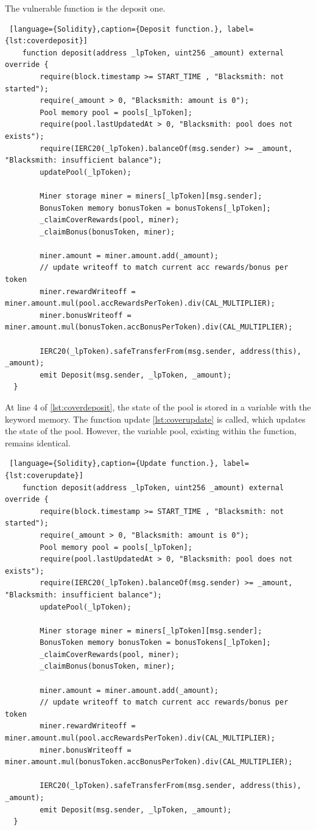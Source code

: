 The vulnerable function is the deposit one.
\begin{lstlisting} [language={Solidity},caption={Deposit function.}, label={lst:coverdeposit}]
    function deposit(address _lpToken, uint256 _amount) external override {
        require(block.timestamp >= START_TIME , "Blacksmith: not started");
        require(_amount > 0, "Blacksmith: amount is 0");
        Pool memory pool = pools[_lpToken];
        require(pool.lastUpdatedAt > 0, "Blacksmith: pool does not exists");
        require(IERC20(_lpToken).balanceOf(msg.sender) >= _amount, "Blacksmith: insufficient balance");
        updatePool(_lpToken);

        Miner storage miner = miners[_lpToken][msg.sender];
        BonusToken memory bonusToken = bonusTokens[_lpToken];
        _claimCoverRewards(pool, miner);
        _claimBonus(bonusToken, miner);

        miner.amount = miner.amount.add(_amount);
        // update writeoff to match current acc rewards/bonus per token
        miner.rewardWriteoff = miner.amount.mul(pool.accRewardsPerToken).div(CAL_MULTIPLIER);
        miner.bonusWriteoff = miner.amount.mul(bonusToken.accBonusPerToken).div(CAL_MULTIPLIER);

        IERC20(_lpToken).safeTransferFrom(msg.sender, address(this), _amount);
        emit Deposit(msg.sender, _lpToken, _amount);
  }
\end{lstlisting}
At line 4 of \autoref{lst:coverdeposit}, the state of the pool is stored in a variable with the keyword memory. 
The function update \autoref{lst:coverupdate} is called, which updates the state of the pool. However, the variable pool, 
existing within the function, remains identical. 
\begin{lstlisting} [language={Solidity},caption={Update function.}, label={lst:coverupdate}]
    function deposit(address _lpToken, uint256 _amount) external override {
        require(block.timestamp >= START_TIME , "Blacksmith: not started");
        require(_amount > 0, "Blacksmith: amount is 0");
        Pool memory pool = pools[_lpToken];
        require(pool.lastUpdatedAt > 0, "Blacksmith: pool does not exists");
        require(IERC20(_lpToken).balanceOf(msg.sender) >= _amount, "Blacksmith: insufficient balance");
        updatePool(_lpToken);

        Miner storage miner = miners[_lpToken][msg.sender];
        BonusToken memory bonusToken = bonusTokens[_lpToken];
        _claimCoverRewards(pool, miner);
        _claimBonus(bonusToken, miner);

        miner.amount = miner.amount.add(_amount);
        // update writeoff to match current acc rewards/bonus per token
        miner.rewardWriteoff = miner.amount.mul(pool.accRewardsPerToken).div(CAL_MULTIPLIER);
        miner.bonusWriteoff = miner.amount.mul(bonusToken.accBonusPerToken).div(CAL_MULTIPLIER);

        IERC20(_lpToken).safeTransferFrom(msg.sender, address(this), _amount);
        emit Deposit(msg.sender, _lpToken, _amount);
  }
\end{lstlisting}

